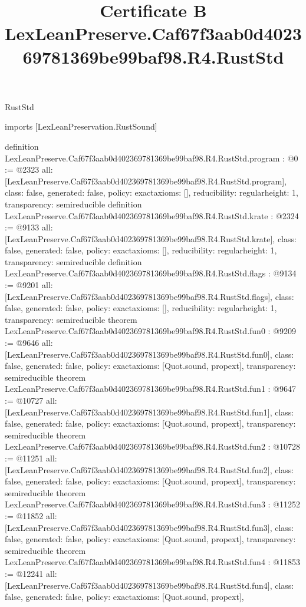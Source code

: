 \begin{lexlean}{RustStd}
\title{Certificate B LexLeanPreserve.Caf67f3aab0d402369781369be99baf98.R4.RustStd}
\begin{coremodule}
imports [LexLeanPreservation.RustSound]

definition LexLeanPreserve.Caf67f3aab0d402369781369be99baf98.R4.RustStd.program : @0 := @2323 {
  all: [LexLeanPreserve.Caf67f3aab0d402369781369be99baf98.R4.RustStd.program],
  class: false,
  generated: false,
  policy: exact{axioms: []},
  reducibility: regular{height: 1},
  transparency: semireducible
}
definition LexLeanPreserve.Caf67f3aab0d402369781369be99baf98.R4.RustStd.krate : @2324 := @9133 {
  all: [LexLeanPreserve.Caf67f3aab0d402369781369be99baf98.R4.RustStd.krate],
  class: false,
  generated: false,
  policy: exact{axioms: []},
  reducibility: regular{height: 1},
  transparency: semireducible
}
definition LexLeanPreserve.Caf67f3aab0d402369781369be99baf98.R4.RustStd.flags : @9134 := @9201 {
  all: [LexLeanPreserve.Caf67f3aab0d402369781369be99baf98.R4.RustStd.flags],
  class: false,
  generated: false,
  policy: exact{axioms: []},
  reducibility: regular{height: 1},
  transparency: semireducible
}
theorem LexLeanPreserve.Caf67f3aab0d402369781369be99baf98.R4.RustStd.fun0 : @9209 := @9646 {
  all: [LexLeanPreserve.Caf67f3aab0d402369781369be99baf98.R4.RustStd.fun0],
  class: false,
  generated: false,
  policy: exact{axioms: [Quot.sound, propext]},
  transparency: semireducible
}
theorem LexLeanPreserve.Caf67f3aab0d402369781369be99baf98.R4.RustStd.fun1 : @9647 := @10727 {
  all: [LexLeanPreserve.Caf67f3aab0d402369781369be99baf98.R4.RustStd.fun1],
  class: false,
  generated: false,
  policy: exact{axioms: [Quot.sound, propext]},
  transparency: semireducible
}
theorem LexLeanPreserve.Caf67f3aab0d402369781369be99baf98.R4.RustStd.fun2 : @10728 := @11251 {
  all: [LexLeanPreserve.Caf67f3aab0d402369781369be99baf98.R4.RustStd.fun2],
  class: false,
  generated: false,
  policy: exact{axioms: [Quot.sound, propext]},
  transparency: semireducible
}
theorem LexLeanPreserve.Caf67f3aab0d402369781369be99baf98.R4.RustStd.fun3 : @11252 := @11852 {
  all: [LexLeanPreserve.Caf67f3aab0d402369781369be99baf98.R4.RustStd.fun3],
  class: false,
  generated: false,
  policy: exact{axioms: [Quot.sound, propext]},
  transparency: semireducible
}
theorem LexLeanPreserve.Caf67f3aab0d402369781369be99baf98.R4.RustStd.fun4 : @11853 := @12241 {
  all: [LexLeanPreserve.Caf67f3aab0d402369781369be99baf98.R4.RustStd.fun4],
  class: false,
  generated: false,
  policy: exact{axioms: [Quot.sound, propext]},
}
\end{coremodule}
\end{lexlean}
